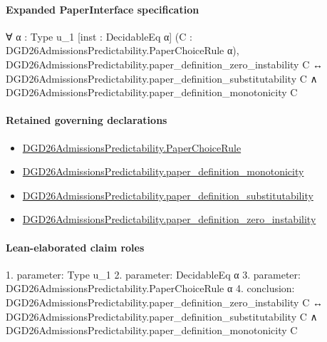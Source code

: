\documentclass[10pt]{article}
\begin{document}
\paragraph{Expanded PaperInterface specification}
\begin{ReviewVerbatim}
∀ {α : Type u_1} [inst : DecidableEq α] (C : DGD26AdmissionsPredictability.PaperChoiceRule α),
  DGD26AdmissionsPredictability.paper_definition_zero_instability C ↔
    DGD26AdmissionsPredictability.paper_definition_substitutability C ∧
      DGD26AdmissionsPredictability.paper_definition_monotonicity C
\end{ReviewVerbatim}

\paragraph{Retained governing declarations}
\begin{itemize}\raggedright
\item \hyperlink{governing-declaration-4678951b4432b184}{DGD26\allowbreak{}Admissions\allowbreak{}Predictability.\allowbreak{}Paper\allowbreak{}Choice\allowbreak{}Rule}
\item \hyperlink{governing-declaration-bac62f3daf5d4d98}{DGD26\allowbreak{}Admissions\allowbreak{}Predictability.\allowbreak{}paper\_\allowbreak{}definition\_\allowbreak{}monotonicity}
\item \hyperlink{governing-declaration-39cdd64a379d386b}{DGD26\allowbreak{}Admissions\allowbreak{}Predictability.\allowbreak{}paper\_\allowbreak{}definition\_\allowbreak{}substitutability}
\item \hyperlink{governing-declaration-c23ecf0aa84721c4}{DGD26\allowbreak{}Admissions\allowbreak{}Predictability.\allowbreak{}paper\_\allowbreak{}definition\_\allowbreak{}zero\_\allowbreak{}instability}
\end{itemize}
\paragraph{Lean-elaborated claim roles}\begin{ReviewVerbatim}
1. parameter: Type u_1
2. parameter: DecidableEq α
3. parameter: DGD26AdmissionsPredictability.PaperChoiceRule α
4. conclusion: DGD26AdmissionsPredictability.paper_definition_zero_instability C ↔
  DGD26AdmissionsPredictability.paper_definition_substitutability C ∧
    DGD26AdmissionsPredictability.paper_definition_monotonicity C
\end{ReviewVerbatim}
\end{document}
